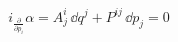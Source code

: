 \begin{equation}
  i_{\frac{\partial}{\partial p_i}}\alpha
  = A^i_j\,\dd q^j + P^{ij}\,\dd p_j
  = 0
\end{equation}

